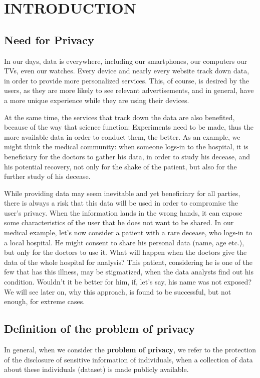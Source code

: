 \chapter{INTRODUCTION}

\section{Need for Privacy}


\par In our days, data is everywhere, including our smartphones, our computers our TVs, even our watches. Every device and nearly every website track down data, in order to provide more personalized services. This, of course, is desired by the users, as they are more likely to see relevant advertisements, and in general, have a more unique experience while they are using their devices.

\par At the same time, the services that track down the data are also benefited, because of the way that science function: Experiments need to be made, thus the more available data in order to conduct them, the better. As an example, we might think the medical community: when someone logs-in to the hospital, it is beneficiary for the doctors to gather his data, in order to study his decease, and his potential recovery, not only for the shake of the patient, but also for the further study of his decease. 

\par While providing data may seem inevitable and yet beneficiary for all parties, there is always a risk that this data will be used in order to compromise the user's privacy. When the information lands in the wrong hands, it can expose some characteristics of the user that he does not want to be shared. In our medical example, let's now consider a patient with a rare decease, who logs-in to a local hospital. He might consent to share his personal data (name, age etc.), but only for the doctors to use it. What will happen when the doctors give the data of the whole hospital for analysis? This patient, considering he is one of the few that has this illness, may be stigmatized,  when the data analysts find out his condition. Wouldn't it be better for him, if, let's say, his name was not exposed? We will see later on, why this approach, is found to be successful, but not enough, for extreme cases.

\section{Definition of the problem of privacy}
\par In general, when we consider the \textbf{problem of privacy}, we refer to the protection of the disclosure of sensitive information of individuals, when a collection of data about these individuals (dataset) is made publicly available.

